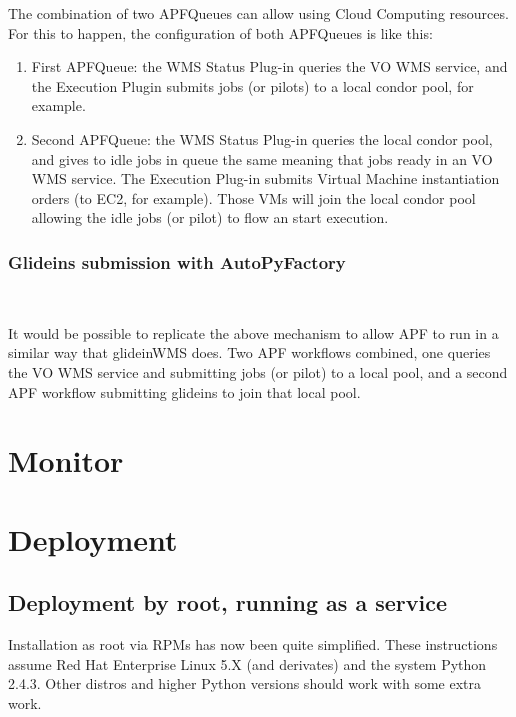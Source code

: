 \documentclass[a4paper]{jpconf}
\begin{document}
\noindent The combination of two APFQueues can allow using Cloud Computing resources. 
For this to happen, the configuration of both APFQueues is like this:

\begin{enumerate}
\item First APFQueue: 
the WMS Status Plug-in queries the VO WMS service, and the Execution Plugin submits jobs (or pilots) to a local condor pool, for example.
\item Second APFQueue: 
the WMS Status Plug-in queries the local condor pool, 
and gives to idle jobs in queue the same meaning that jobs ready in an VO WMS service. 
The Execution Plug-in submits Virtual Machine instantiation orders (to EC2, for example). 
Those VMs will join the local condor pool allowing the idle jobs (or pilot) to flow an start execution. 
\end{enumerate}

\subsubsection{Glideins submission with AutoPyFactory}

~

\noindent It would be possible to replicate the above mechanism to allow APF to run in a similar way that glideinWMS does. 
Two APF workflows combined, one queries the VO WMS service and submitting jobs (or pilot) to a local pool, 
and a second APF workflow submitting glideins to join that local pool. 

\section{Monitor}

\section{Deployment}

\subsection{Deployment by root, running as a service}

Installation as root via RPMs has now been quite simplified. 
These instructions assume Red Hat Enterprise Linux 5.X (and derivates) and the system Python 2.4.3. 
Other distros and higher Python versions should work with some extra work.
\end{document}
